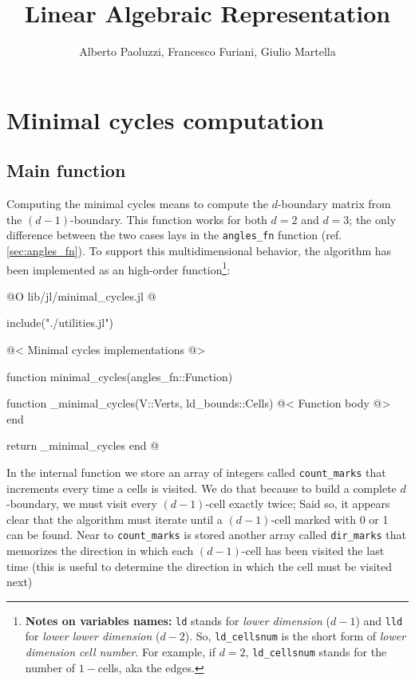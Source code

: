 \documentclass[10pt]{book}
\author{Alberto Paoluzzi, Francesco Furiani, Giulio Martella}
\title{Linear Algebraic Representation}
\begin{document}
\frontmatter
\maketitle
\tableofcontents





\mainmatter

\chapter{Minimal cycles computation}
\label{ch:minimal_cycles}

\section{Main function}


Computing the minimal cycles means to compute the $d$-boundary matrix
from the $(d-1)$-boundary. This function works for both $d=2$ and $d=3$;
the only difference between the two cases lays in the \texttt{angles\_fn}
function (ref. \ref{sec:angles_fn}). To support this multidimensional
behavior, the algorithm has been implemented as an high-order function\footnote{
    \textbf{Notes on variables names:} \texttt{ld} stands for \textit{lower dimension} ($d-1$)
    and \texttt{lld} for \textit{lower lower dimension} ($d-2$). So, \texttt{ld\_cellsnum} is the
    short form of \textit{lower dimension cell number}. For example, if $d=2$, \texttt{ld\_cellsnum} stands for the
    number of $1-$cells, aka the edges.
}:

@O lib/jl/minimal_cycles.jl
@{include("./utilities.jl")

@< Minimal cycles implementations @>

function minimal_cycles(angles_fn::Function)

    function _minimal_cycles(V::Verts, ld_bounds::Cells)
        @< Function body @>
    end

    return _minimal_cycles
end
@}

In the internal function we store an array of integers called \texttt{count\_marks} 
that increments every time a cells is visited. We do that because to build 
a complete $d$-boundary, we must visit every $(d-1)$-cell exactly twice;
Said so, it appears clear that the algorithm must iterate until a $(d-1)$-cell 
marked with 0 or 1 can be found. Near to \texttt{count\_marks} is stored another
array called \texttt{dir\_marks} that memorizes the direction in which each $(d-1)$-cell
has been visited the last time (this is useful to determine the direction in which the cell
must be visited next)
\end{document}
